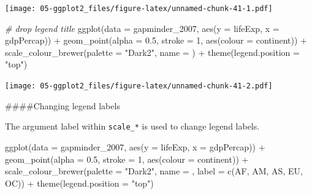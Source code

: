 \documentclass[
]{book}
\newenvironment{Shaded}{\begin{snugshade}}{\end{snugshade}}
\newcommand{\AttributeTok}[1]{\textcolor[rgb]{0.77,0.63,0.00}{#1}}
\newcommand{\CommentTok}[1]{\textcolor[rgb]{0.56,0.35,0.01}{\textit{#1}}}
\newcommand{\DecValTok}[1]{\textcolor[rgb]{0.00,0.00,0.81}{#1}}
\newcommand{\FloatTok}[1]{\textcolor[rgb]{0.00,0.00,0.81}{#1}}
\newcommand{\FunctionTok}[1]{\textcolor[rgb]{0.00,0.00,0.00}{#1}}
\newcommand{\NormalTok}[1]{#1}
\newcommand{\SpecialCharTok}[1]{\textcolor[rgb]{0.00,0.00,0.00}{#1}}
\newcommand{\StringTok}[1]{\textcolor[rgb]{0.31,0.60,0.02}{#1}}
\begin{document}
\texttt{[image: 05-ggplot2\_files/figure-latex/unnamed-chunk-41-1.pdf]}

\begin{Shaded}
\begin{Highlighting}[]
\CommentTok{\# drop legend title}
\FunctionTok{ggplot}\NormalTok{(}\AttributeTok{data =}\NormalTok{ gapminder\_2007, }\FunctionTok{aes}\NormalTok{(}\AttributeTok{y =}\NormalTok{ lifeExp, }\AttributeTok{x =}\NormalTok{ gdpPercap)) }\SpecialCharTok{+} 
  \FunctionTok{geom\_point}\NormalTok{(}\AttributeTok{alpha =} \FloatTok{0.5}\NormalTok{, }\AttributeTok{stroke =} \DecValTok{1}\NormalTok{, }\FunctionTok{aes}\NormalTok{(}\AttributeTok{colour =}\NormalTok{ continent)) }\SpecialCharTok{+}
  \FunctionTok{scale\_colour\_brewer}\NormalTok{(}\AttributeTok{palette =} \StringTok{"Dark2"}\NormalTok{, }\AttributeTok{name =} \StringTok{\textquotesingle{}\textquotesingle{}}\NormalTok{) }\SpecialCharTok{+}
  \FunctionTok{theme}\NormalTok{(}\AttributeTok{legend.position =} \StringTok{"top"}\NormalTok{)}
\end{Highlighting}
\end{Shaded}

\texttt{[image: 05-ggplot2\_files/figure-latex/unnamed-chunk-41-2.pdf]}

\#\#\#\#Changing legend labels

The argument label within \texttt{scale\_*} is used to change legend labels.

\begin{Shaded}
\begin{Highlighting}[]
\FunctionTok{ggplot}\NormalTok{(}\AttributeTok{data =}\NormalTok{ gapminder\_2007, }\FunctionTok{aes}\NormalTok{(}\AttributeTok{y =}\NormalTok{ lifeExp, }\AttributeTok{x =}\NormalTok{ gdpPercap)) }\SpecialCharTok{+} 
  \FunctionTok{geom\_point}\NormalTok{(}\AttributeTok{alpha =} \FloatTok{0.5}\NormalTok{, }\AttributeTok{stroke =} \DecValTok{1}\NormalTok{, }\FunctionTok{aes}\NormalTok{(}\AttributeTok{colour =}\NormalTok{ continent)) }\SpecialCharTok{+}
  \FunctionTok{scale\_colour\_brewer}\NormalTok{(}\AttributeTok{palette =} \StringTok{"Dark2"}\NormalTok{, }\AttributeTok{name =} \StringTok{\textquotesingle{}\textquotesingle{}}\NormalTok{, }\AttributeTok{label =} \FunctionTok{c}\NormalTok{(}\StringTok{\textquotesingle{}AF\textquotesingle{}}\NormalTok{, }\StringTok{\textquotesingle{}AM\textquotesingle{}}\NormalTok{, }\StringTok{\textquotesingle{}AS\textquotesingle{}}\NormalTok{, }\StringTok{\textquotesingle{}EU\textquotesingle{}}\NormalTok{, }\StringTok{\textquotesingle{}OC\textquotesingle{}}\NormalTok{)) }\SpecialCharTok{+}
  \FunctionTok{theme}\NormalTok{(}\AttributeTok{legend.position =} \StringTok{"top"}\NormalTok{)}
\end{Highlighting}
\end{Shaded}
\end{document}
